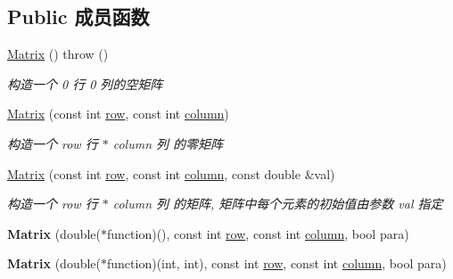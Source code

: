 \subsection*{Public 成员函数}
\begin{DoxyCompactItemize}
\item 
\mbox{\label{classkerbal_1_1math_1_1_matrix_a201ef9e1e51430d7a3cd6ca2093e9981}} 
\hyperlink{classkerbal_1_1math_1_1_matrix_a201ef9e1e51430d7a3cd6ca2093e9981}{Matrix} ()  throw ()
\begin{DoxyCompactList}\small\item\em 构造一个 0 行 0 列的空矩阵 \end{DoxyCompactList}\item 
\hyperlink{classkerbal_1_1math_1_1_matrix_a07582c4589d21d351350fce8459c10da}{Matrix} (const int \hyperlink{classarray__2d_1_1_array__2d_a17b90b53a8e0002452e96c2b7f74820b}{row}, const int \hyperlink{classarray__2d_1_1_array__2d_abdf56a1c0f22088353d9a32de9680d76}{column})
\begin{DoxyCompactList}\small\item\em 构造一个 row 行 $\ast$ column 列 的零矩阵 \end{DoxyCompactList}\item 
\hyperlink{classkerbal_1_1math_1_1_matrix_a17111be388a194c33c39946cb7548d79}{Matrix} (const int \hyperlink{classarray__2d_1_1_array__2d_a17b90b53a8e0002452e96c2b7f74820b}{row}, const int \hyperlink{classarray__2d_1_1_array__2d_abdf56a1c0f22088353d9a32de9680d76}{column}, const double \&val)
\begin{DoxyCompactList}\small\item\em 构造一个 row 行 $\ast$ column 列 的矩阵, 矩阵中每个元素的初始值由参数 val 指定 \end{DoxyCompactList}\item 
\mbox{\label{classkerbal_1_1math_1_1_matrix_a4cf66d9295ca617254d1fc0d88c33245}} 
{\bfseries Matrix} (double($\ast$function)(), const int \hyperlink{classarray__2d_1_1_array__2d_a17b90b53a8e0002452e96c2b7f74820b}{row}, const int \hyperlink{classarray__2d_1_1_array__2d_abdf56a1c0f22088353d9a32de9680d76}{column}, bool para)
\item 
\mbox{\label{classkerbal_1_1math_1_1_matrix_a627aae6f1eb7e9da770730cf75a62c75}} 
{\bfseries Matrix} (double($\ast$function)(int, int), const int \hyperlink{classarray__2d_1_1_array__2d_a17b90b53a8e0002452e96c2b7f74820b}{row}, const int \hyperlink{classarray__2d_1_1_array__2d_abdf56a1c0f22088353d9a32de9680d76}{column}, bool para)

\end{DoxyCompactItemize}
